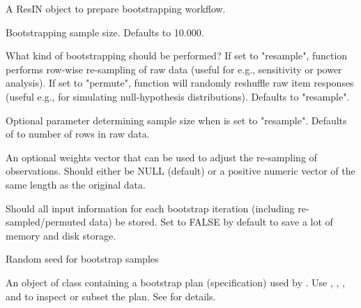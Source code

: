 \documentclass[a4paper]{book}
\begin{document}
\begin{Arguments}
\begin{ldescription}
\item[\code{ResIN\_object}] A ResIN object to prepare bootstrapping workflow.

\item[\code{n}] Bootstrapping sample size. Defaults to 10.000.

\item[\code{boots\_type}] What kind of bootstrapping should be performed? If set to "resample", function performs row-wise re-sampling of raw data (useful for e.g., sensitivity or power analysis). If set to "permute", function will randomly reshuffle raw item responses (useful e.g., for simulating null-hypothesis distributions). Defaults to "resample".

\item[\code{resample\_size}] Optional parameter determining sample size when  is set to "resample". Defaults of to number of rows in raw data.

\item[\code{weights}] An optional weights vector that can be used to adjust the re-sampling of observations. Should either be NULL (default) or a positive numeric vector of the same length as the original data.

\item[\code{save\_input}] Should all input information for each bootstrap iteration (including re-sampled/permuted data) be stored. Set to FALSE by default to save a lot of memory and disk storage.

\item[\code{seed\_boots}] Random seed for bootstrap samples
\end{ldescription}
\end{Arguments}
%
\begin{Value}
An object of class  containing a bootstrap plan
(specification) used by .
Use , , , and \code{[}
to inspect or subset the plan. See  for details.
\end{Value}
%
\end{document}
